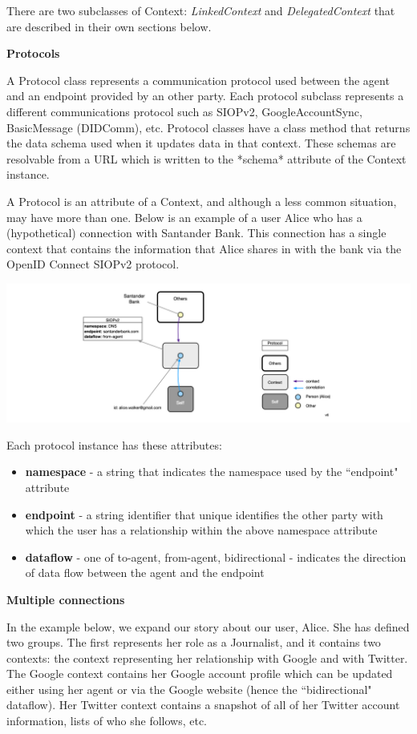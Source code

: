 \documentclass[11pt, oneside]{article}   	%
\begin{document}
There are two subclasses of Context: \emph{LinkedContext} and \emph{DelegatedContext} that are described in their own sections below.

\textbf{Protocols}

A Protocol class represents a communication protocol used between the agent and an endpoint provided by an other party. Each protocol subclass represents a different communications protocol such as SIOPv2, GoogleAccountSync, BasicMessage (DIDComm), etc.  Protocol classes have a class method that returns the data schema used when it updates data in that context. These schemas are resolvable from a URL which is written to the *schema* attribute of the Context instance.

A Protocol is an attribute of a Context, and although a less common situation, may have more than one. Below is an example of a user Alice who has a (hypothetical) connection with Santander Bank. This connection has a single context that contains the information that Alice shares in with the bank via the OpenID Connect SIOPv2 protocol.

\includegraphics[width=\textwidth]{./images/context-with-protocol.png}

Each protocol instance has these attributes:

\begin{itemize}
\item \textbf{namespace} - a string that indicates the namespace used by the ``endpoint" attribute
\item \textbf{endpoint} - a string identifier that unique identifies the other party with which the user has a relationship within the above namespace attribute
\item \textbf{dataflow} - one of {to-agent, from-agent, bidirectional} - indicates the direction of data flow between the agent and the endpoint
\end{itemize}

\textbf{Multiple connections}

In the example below, we expand our story about our user, Alice. She has defined two groups. The first represents her role as a Journalist, and it contains two contexts: the context representing her relationship with Google and with Twitter. The Google context contains her Google account profile which can be updated either using her agent or via the Google website (hence the ``bidirectional" dataflow). Her Twitter context contains a snapshot of all of her Twitter account information, lists of who she follows, etc. 
\end{document}
